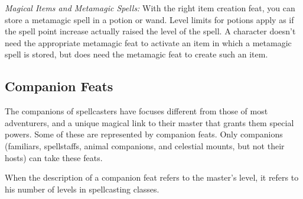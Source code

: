 \emph{Magical Items and Metamagic Spells:} With the right item creation feat, 
you can store a metamagic spell in a potion or wand. 
Level limits for potions apply as if the spell point increase actually raised the level of the spell. 
A character doesn't need the appropriate metamagic feat to activate an item in which a metamagic spell is stored, 
but does need the metamagic feat to create such an item.
\subsection{Companion Feats}
\label{sec:CompanionFeats}
The companions of spellcasters have focuses different from those of most adventurers, and a unique magical link to their master that grants them special powers.
Some of these are represented by companion feats. Only companions (familiars, spellstaffs, animal companions, and celestial mounts, but not their hosts) can take these feats.

When the description of a companion feat refers to the master's level, it refers to his number of levels in spellcasting classes.

